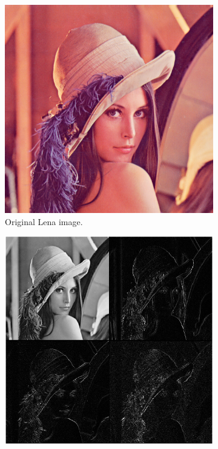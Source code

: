 \documentclass[12pt]{article}
\theoremstyle{definition}
\begin{document}
  \begin{figure}
    \centering
    \begin{subfigure}{.48\textwidth}
    \includegraphics[width=.99\textwidth]{figs/lena.png}
    \caption{Original Lena image.}
    \label{fig:lena-dec-orig}
    \end{subfigure}
    \begin{subfigure}{.48\textwidth}
      \includegraphics[width=.99\textwidth]{figs/lena-dec-1.png}

\end{subfigure}
\end{figure}
\end{document}
